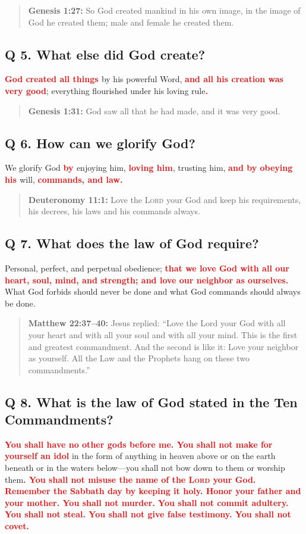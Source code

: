\documentclass[titlepage]{memoir}
\newcommand\Children[1]{\textbf{\textcolor{red}{#1}}}
\newcommand\Quote[2]{\begin{quote}{\small\textbf{#1:}{ #2}}\end{quote}}
\begin{document}
\Quote{Genesis 1:27}{So God created mankind in his own image, in the image of God he created them; male and female he created them.}


\subsection{Q  5. What else did God create?}
\Children{God created all things }by his powerful Word, \Children{and all his creation was very good}; everything flourished under his loving rule\Children{.}

\Quote{Genesis 1:31}{God saw all that he had made, and it was very good.}


\subsection{Q  6. How can we glorify God?}
We glorify God \Children{by }enjoying him, \Children{loving him}, trusting him, \Children{ and by obeying his }will, \Children{commands, and law.}

\Quote{Deuteronomy 11:1}{Love the \textsc{Lord} your God and keep his requirements, his decrees, his laws and his commands always.}


\subsection{Q 7. What does the law of God require?}
Personal, perfect, and perpetual obedience; \Children{that we love God with all our heart, soul, mind, and strength; and love our neighbor as ourselves.} What God forbids should never be done and what God commands should always be done.

\Quote{Matthew 22:37--40}{Jesus replied: ``Love the Lord your God with all your heart and with all your soul and with all your mind. This is the first and greatest commandment. And the second is like it: Love your neighbor as yourself. All the Law and the Prophets hang on these two commandments.''}

\subsection{Q 8. What is the law of God stated in the Ten Commandments?}
\Children{You shall have no other gods before me. You shall not make for yourself an idol} in the form of anything in heaven above or on the earth beneath or in the waters below\thinspace{}---\thinspace{}you shall not bow down to them or worship them\Children{. You shall not misuse the name of the \textsc{Lord} your God. Remember the Sabbath day by keeping it holy. Honor your father and your mother. You shall not murder. You shall not commit adultery. You shall not steal. You shall not give false testimony. You shall not covet.}
\end{document}

